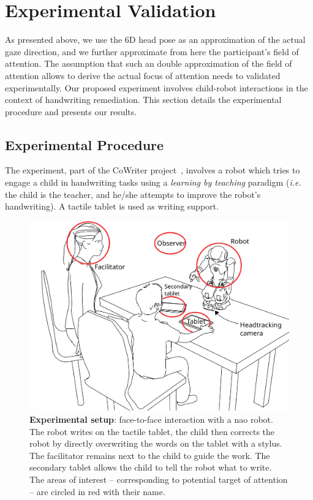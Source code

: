 \documentclass{sig-alternate}
\newcommand{\ie}{\textit{i.e.}\xspace}
\begin{document}

\section{Experimental Validation}
\label{sec:expe}

As presented above, we use the 6D head pose as an approximation of the
actual gaze direction, and we further approximate from here the participant's field of
attention. The assumption that such an double approximation of the field of attention
allows to derive the actual focus of attention needs to validated experimentally.
Our proposed experiment involves child-robot
interactions in the context of handwriting remediation.
This section details the experimental procedure and presents our results.


\subsection{Experimental Procedure}

The experiment, part of the CoWriter project~\cite{Hood:2015}, involves a robot
which tries to engage a child in handwriting tasks using a \emph{learning by teaching}
paradigm (\ie the child is the teacher, and he/she attempts to improve the
robot's handwriting). A tactile tablet is used as writing support.

\begin{figure}[h!]
    \centering
    \includegraphics[width=0.8\columnwidth]{experimental_setup}
    \caption{\small \textbf{Experimental setup}: face-to-face interaction with a {\sc
            nao} robot. The robot writes on the tactile tablet, the child then
            corrects the robot by directly overwriting the words on the tablet
            with a stylus. The facilitator remains next to the child to guide the work. 
            The secondary tablet allows the child to tell the robot what to
            write. The areas of interest -- corresponding to potential target of
            attention -- are circled in red with their name.}
    \label{fig:setup}
\end{figure}
\end{document}
